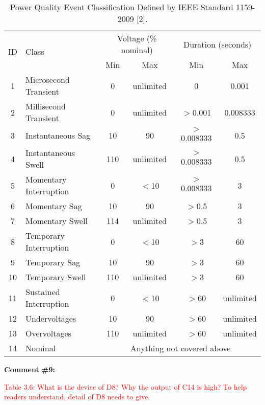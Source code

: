 \documentclass[journal]{IEEEtran}
\begin{document}
\begin{table}[!h]
\center \color{blue}
\caption{Power Quality Event Classification Defined by IEEE Standard 1159-2009 [2].}
\begin{tabular}{|c|l|c|c|c|c|}
\hline \multirow{2}{*}{ID} & \multirow{2}{*}{Class} & \multicolumn{2}{|c|}{Voltage (\% nominal)} & \multicolumn{2}{|c|}{Duration (seconds)} \\
\cline{3-6}  &  & Min & Max & Min & Max \\ 
\hline  1 & Microsecond Transient  & 0   & unlimited & 0           & 0.001    \\
\hline  2 & Millisecond Transient  & 0   & unlimited & $>$0.001    & 0.008333 \\
\hline  3 & Instantaneous Sag      & 10  & 90        & $>$0.008333 & 0.5      \\
\hline  4 & Instantaneous Swell    & 110 & unlimited & $>$0.008333 & 0.5      \\
\hline  5 & Momentary Interruption & 0   & $<$10     & $>$0.008333 & 3        \\
\hline  6 & Momentary Sag          & 10  & 90        & $>$0.5      & 3        \\
\hline  7 & Momentary Swell        & 114 & unlimited & $>$0.5      & 3        \\
\hline  8 & Temporary Interruption & 0   & $<$10     & $>$3        & 60       \\
\hline  9 & Temporary Sag          & 10  & 90        & $>$3        & 60       \\
\hline 10 & Temporary Swell        & 110 & unlimited & $>$3        & 60       \\
\hline 11 & Sustained Interruption & 0   & $<$10     & $>$60       & unlimited\\
\hline 12 & Undervoltages          & 10  & 90        & $>$60       & unlimited\\
\hline 13 & Overvoltages           & 110 & unlimited & $>$60       & unlimited\\
\hline 14 & Nominal                & \multicolumn{4}{|c|}{Anything not covered above} \\ \hline
\end{tabular}
\end{table}


\vspace{30pt}
\textbf{Comment \#9:}
\begin{adjustwidth}{2.5em}{0pt}
\singlespacing \vspace{-10pt}
\textcolor{red}{Table 3.6: What is the device of D8? Why the output of C14 is high?  To help readers understand, detail of D8 needs to give.}
\end{adjustwidth}
\end{document}
